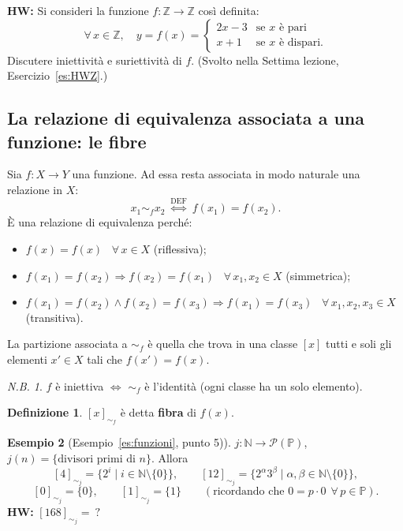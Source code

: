 \documentclass[11pt,a4paper]{article}
\newcommand{\N}{\mathbb{N}}
\newcommand{\Z}{\mathbb{Z}}
\newcommand{\Prim}{\mathbb{P}}
\newcommand{\Pot}{\mathcal{P}}
\theoremstyle{definition}
\newtheorem{definizione}{Definizione}[section]
\newtheorem{esempio}[definizione]{Esempio}
\theoremstyle{plain}
\theoremstyle{remark}
\newtheorem*{nb}{N.B.}
\begin{document}
\textbf{HW:} Si consideri la funzione $f\colon\Z\to\Z$ cos\`i definita:
\[
\forall\, x\in\Z,\quad y=f(x)=\begin{cases}2x-3&\text{se } x \text{ \`e pari}\\ x+1&\text{se } x\text{ \`e dispari.}\end{cases}
\]
Discutere iniettivit\`a e suriettivit\`a di $f$. \quad (Svolto nella Settima lezione, Esercizio~\ref{es:HWZ}.)

\subsection{La relazione di equivalenza associata a una funzione: le fibre}

Sia $f\colon X\to Y$ una funzione. Ad essa resta associata in modo naturale una relazione in $X$:
\[
x_1\sim_f x_2\ \stackrel{\text{DEF}}{\iff}\ f(x_1)=f(x_2).
\]
\`E una relazione di equivalenza perch\'e:
\begin{itemize}
\item $f(x)=f(x)$ \ $\forall\,x\in X$ \quad (riflessiva);
\item $f(x_1)=f(x_2)\Rightarrow f(x_2)=f(x_1)$ \ $\forall\,x_1,x_2\in X$ \quad (simmetrica);
\item $f(x_1)=f(x_2)\wedge f(x_2)=f(x_3)\Rightarrow f(x_1)=f(x_3)$ \ $\forall\,x_1,x_2,x_3\in X$ \quad (transitiva).
\end{itemize}
La partizione associata a $\sim_f$ \`e quella che trova in una classe $[x]$ tutti e soli gli elementi $x'\in X$ tali che $f(x')=f(x)$.

\begin{nb}
$f$ \`e iniettiva $\iff$ $\sim_f$ \`e l'identit\`a (ogni classe ha un solo elemento).
\end{nb}

\begin{definizione}
$[x]_{\sim_f}$ \`e detta \textbf{fibra} di $f(x)$.
\end{definizione}

\begin{esempio}[Esempio~\ref{es:funzioni}, punto 5)]
$j\colon\N\to\Pot(\Prim)$, $j(n)=\{\text{divisori primi di }n\}$. Allora
\[
[4]_{\sim_j}=\{2^i\mid i\in\N\setminus\{0\}\},\qquad
[12]_{\sim_j}=\{2^\alpha3^\beta\mid\alpha,\beta\in\N\setminus\{0\}\},
\]
\[
[0]_{\sim_j}=\{0\},\qquad [1]_{\sim_j}=\{1\}\qquad(\text{ricordando che } 0=p\cdot0\ \ \forall\,p\in\Prim).
\]
\textbf{HW:} $[168]_{\sim_j}=\ ?$
\end{esempio}
\end{document}
